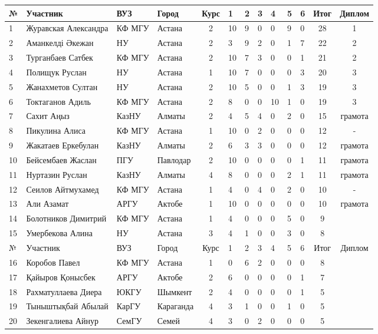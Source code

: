 \begin{tabular}{|l|l|l|l|c|*{6}{p{0.3cm}|}c|c|}
\hline
№ & Участник & ВУЗ & Город & Курс & 1 & 2 & 3 & 4 & 5 & 6 & Итог & Диплом\\
\hline
1 & Журавская Александра & КФ МГУ  & Астана & 2 & 10 & 9 & 0 & 0 & 9 & 0 & 28 & 1\\ 
\hline
2 & Аманкелді Әкежан & НУ  & Астана &  2 & 3 & 9 & 2 & 0 & 1 & 7 & 22 & 2\\ 
\hline
3 & Турганбаев Сатбек & КФ МГУ  & Астана & 2 & 10 & 7 & 3 & 0 & 0 & 1 & 21 & 2\\ 
\hline
4 & Полищук Руслан & НУ  & Астана & 1 & 10 & 7 & 0 & 0 & 0 & 3 & 20 & 3\\ 
\hline
5 & Жанахметов Султан & НУ  & Астана & 2 & 10 & 5 & 0 & 0 & 1 & 3 & 19 & 3\\ 
\hline
6 & Токтаганов Адиль & КФ МГУ  & Астана & 2 & 8 & 0 & 0 & 10 & 1 & 0 & 19 & 3\\ 
\hline
7 & Сахит Аңыз & КазНУ  & Алматы & 2 & 4 & 5 & 4 & 0 & 2 & 0 & 15 & грамота\\ 
\hline
8 & Пикулина Алиса & КФ МГУ  & Астана & 1 & 10 & 0 & 2 & 0 & 0 & 0 & 12 & -\\ 
\hline
9 & Жакатаев Еркебулан & КазНУ  & Алматы & 2 & 6 & 3 & 3 & 0 & 0 & 0 & 12 & грамота\\ 
\hline
10 & Бейсембаев Жаслан & ПГУ  & Павлодар & 2 & 10 & 0 & 0 & 0 & 0 & 1 & 11 & грамота\\ 
\hline
11 & Нуртазин Руслан & КазНУ  & Алматы & 4 & 8 & 0 & 0 & 0 & 2 & 1 & 11 & грамота\\ 
\hline
12 & Сеилов Айтмухамед & КФ МГУ  & Астана & 1 & 4 & 0 & 4 & 0 & 2 & 0 & 10 & -\\ 
\hline
13 & Али Азамат & АРГУ  & Актобе & 1 & 10 & 0 & 0 & 0 & 0 & 0 & 10 & грамота\\ 
\hline
14 & Болотников Димитрий & КФ МГУ  & Астана & 1 & 4 & 0 & 0 & 0 & 5 & 0 & 9 & \\ 
\hline
15 & Умербекова Алина & НУ  & Астана & 3 & 4 & 1 & 0 & 0 & 3 & 0 & 8 & \\ 
\hline
№ & Участник & ВУЗ & Город & Курс & 1 & 2 & 3 & 4 & 5 & 6 & Итог & Диплом\\
\hline
16 & Коробов Павел & КФ МГУ  & Астана & 1 & 0 & 6 & 2 & 0 & 0 & 0 & 8 & \\ 
\hline
17 & Қайыров Қонысбек & АРГУ  & Актобе & 2 & 6 & 0 & 0 & 0 & 0 & 1 & 7 & \\ 
\hline
18 & Рахматуллаева Диера & ЮКГУ  & Шымкент & 2 & 4 & 0 & 0 & 0 & 0 & 1 & 5 & \\ 
\hline
19 & Тыныштықбай Абылай & КарГУ  & Караганда & 4 & 3 & 1 & 0 & 0 & 1 & 0 & 5 & \\ 
\hline
20 & Зекенгалиева Айнур & СемГУ  & Семей & 4 & 3 & 0 & 2 & 0 & 0 & 0 & 5 & \\ 
\hline
\end{tabular}

